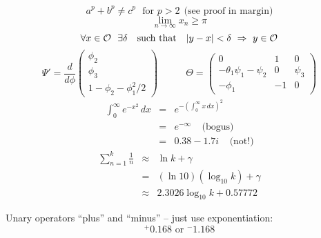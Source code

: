 \begin{equation}  a^{p} + b^p   \neq c^{p} ~~~\mbox{for } p>2
    ~~ \mbox{(see proof in margin)}  \label{eq:fermat}
\end{equation}
$$ \lim_{n \rightarrow \infty}x_{n} \geq \pi $$
$$ \forall x \in {\cal O} ~~\exists \delta ~~~\mbox{such that}~~~
    |y-x|<\delta ~\Rightarrow ~y \in {\cal O} $$
\vspace{2mm}
$$
\Psi' = \frac{d}{d \phi} \left( \begin{array}{c}
  \phi_{2}  \\  \phi_{3}  \\  1 - \phi_{2} - \phi_{1}^{2}/2
 \end{array} \right)
 ~~~~~~~~~~~~~
 \Theta =  \left(   \begin{array}{ccc}
    0           &   1   &   0   \\
- \theta_{1} \psi_{1} - \psi_{2} &  0   &   \psi_3  \\
    -\phi_{1}           &   -1  &   0
            \end{array}  \right)
$$
\vspace{2mm}
\begin{eqnarray}
    \int_0^{\infty} e^{-x^2}\,dx
    & = &   e^{-\left(\int_0^{\infty}x\,dx\right)^2} \label{eq:dumb}  \\
    & = &   e^{-\infty} ~~~~~\mbox{(bogus)} \\
    & = &   0.38-1.7i ~~~~~\mbox{(not!)} \label{eq:realdumb}
\end{eqnarray}
\vspace{2mm}
\begin{eqnarray*}           %
  \sum_{n=1}^k \frac1n
    & \approx & \ln k + \gamma  \\
    & = &       (\ln 10)(\log_{10}k) + \gamma \\
    & \approx & 2.3026\log_{10}k + 0.57772
\end{eqnarray*}

Unary operators ``plus'' and ``minus'' -- just use exponentiation:
$$  {}^{+}0.168  \mbox{ or } {}^{-}1.168    $$

